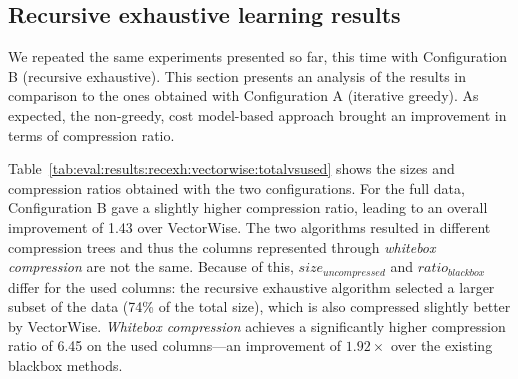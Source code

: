 
\subsection{Recursive exhaustive learning results}
\label{subsec:eval:results:recursiveexhaustive}

We repeated the same experiments presented so far, this time with Configuration B (recursive exhaustive). This section presents an analysis of the results in comparison to the ones obtained with Configuration A (iterative greedy). As expected, the non-greedy, cost model-based approach brought an improvement in terms of compression ratio.



Table~\ref{tab:eval:results:recexh:vectorwise:totalvsused} shows the sizes and compression ratios obtained with the two configurations. For the full data, Configuration B gave a slightly higher compression ratio, leading to an overall improvement of 1.43 over VectorWise. The two algorithms resulted in different compression trees and thus the columns represented through \textit{whitebox compression} are not the same. Because of this, \(size_{uncompressed}\) and \(ratio_{blackbox}\) differ for the used columns: the recursive exhaustive algorithm selected a larger subset of the data (74\% of the total size), which is also compressed slightly better by VectorWise. \textit{Whitebox compression} achieves a significantly higher compression ratio of 6.45 on the used columns---an improvement of \(1.92\times\) over the existing blackbox methods.



